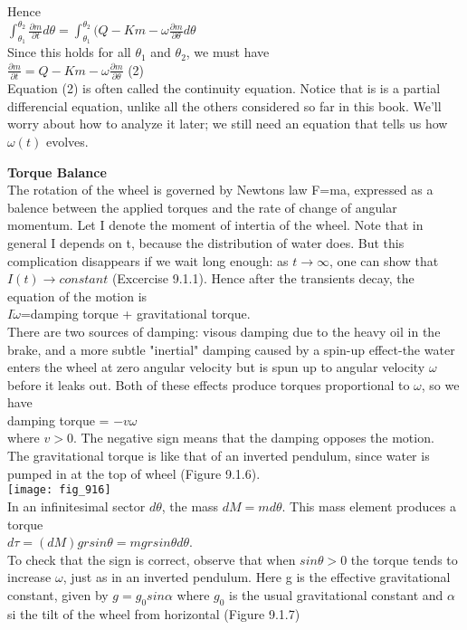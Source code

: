 \documentclass{article}
\newcommand\tab[1][1cm]{\hspace*{#1}}
\begin{document}
Hence \\ \tab \tab
$\int_{\theta_{1}}^{\theta_{2}}\frac{\partial m}{\partial t} d\theta = \int_{\theta_{1}}^{\theta_{2}}(Q-Km-\omega \frac{\partial m}{\partial \theta}d\theta$ \\
Since this holds for all $\theta_{1}$ and $\theta_{2}$, we must have \\ \tab \tab
$\frac{\partial m}{\partial t}=Q-Km-\omega \frac{\partial m}{\partial \theta}$ \tab (2) \\ \tab 
Equation (2) is often called the continuity equation. Notice that is is a partial differencial equation, unlike all the others considered so far in this book. We'll worry about how to analyze it later; we still need an equation that tells us how $\omega(t)$ evolves. 

\textbf {Torque Balance} \\ \tab
The rotation of the wheel is governed by Newtons law F=ma, expressed as a balence between the applied torques and the rate of change of angular momentum. Let I denote the moment of intertia of the wheel. Note that in general I depends on t, because the distribution of water does. But this complication disappears if we wait long enough: as $t \to \infty$, one can show that $I(t) \to constant$ (Excercise 9.1.1). Hence after the transients decay, the equation of the motion is \\ \tab \tab
$I\dot{\omega}$=damping torque + gravitational torque. \\ \tab \tab
There are two sources of damping: visous damping due to the heavy oil in the brake, and a more subtle "inertial" damping caused by a spin-up effect-the water enters the wheel at zero angular velocity but is spun up to angular velocity $\omega$ before it leaks out. Both of these effects produce torques proportional to $\omega$, so we have \\ \tab \tab
damping torque = $-v\omega$ \\
where $v>0$. The negative sign means that the damping opposes the motion. \\ \tab
The gravitational torque is like that of an inverted pendulum, since water is pumped in at the top of wheel (Figure 9.1.6). \\

\texttt{[image: fig\_916]} \\
In an infinitesimal sector $d\theta$, the mass $dM=md\theta$. This mass element produces a torque \\ \tab \tab
$d \tau = (dM)grsin \theta = mg r sin \theta d\theta$. \\
To check that the sign is correct, observe that when $sin \theta > 0$ the torque tends to increase $\omega$, just as in an inverted pendulum. Here g is the effective gravitational constant, given by $g=g_{0} sin \alpha$ where $g_{0}$ is the usual gravitational constant and $\alpha$ si the tilt of the wheel from horizontal (Figure 9.1.7) \\
\end{document}
